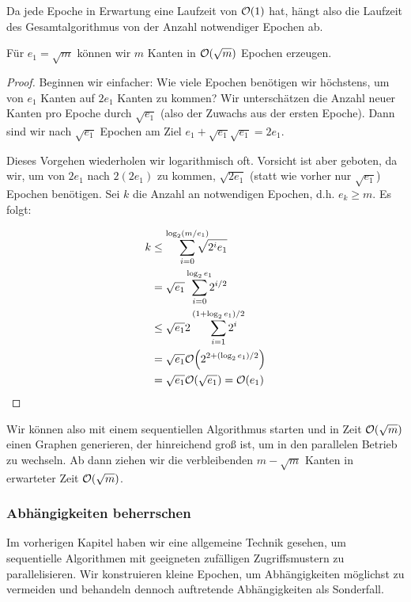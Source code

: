 Da jede Epoche in Erwartung eine Laufzeit von $\mathcal{O}\!\left(1\right)$ hat, hängt also die Laufzeit des Gesamtalgorithmus von der Anzahl notwendiger Epochen ab.

\begin{lemma}
    Für $e_1 = \sqrt{m}$ können wir $m$ Kanten in $\mathcal{O}\!\left(\sqrt{m}\right)$ Epochen erzeugen.
\end{lemma}

\begin{proof}
    Beginnen wir einfacher: Wie viele Epochen benötigen wir höchstens, um von $e_1$ Kanten auf $2e_1$ Kanten zu kommen?
    Wir unterschätzen die Anzahl neuer Kanten pro Epoche durch $\sqrt{e_1}$ (also der Zuwachs aus der ersten Epoche).
    Dann sind wir nach $\sqrt{e_1}$ Epochen am Ziel $e_1 + \sqrt{e_1} \sqrt{e_1} = 2 e_1$.

    Dieses Vorgehen wiederholen wir logarithmisch oft.
    Vorsicht ist aber geboten, da wir, um von $2e_1$ nach $2(2e_1)$ zu kommen, $\sqrt{2 e_1}$ (statt wie vorher nur $\sqrt{e_1}$) Epochen benötigen.
    Sei $k$ die Anzahl an notwendigen Epochen, d.h. $e_k \ge m$.
    Es folgt:

    \begin{align}
        k & \le \smashoperator[r]{\sum_{i=0}^{\ld(m/e_1)}} \sqrt{2^i e_1}      \\
          & = \sqrt{e_1} \smashoperator[r]{\sum_{i=0}^{\ld e_1}} 2^{i/2}       \\
          & \le \sqrt{e_1} 2 \smashoperator[r]{\sum_{i=1}^{(1+\ld e_1)/2}} 2^i \\
          & = \sqrt{e_1} \Oh{2^{2 + (\ld e_1) / 2}}         \\
          & = \sqrt{e_1} \Oh{\sqrt{e_1}} = \Oh{e_1}
    \end{align}
\end{proof}

Wir können also mit einem sequentiellen Algorithmus starten und in Zeit $\mathcal{O}\!\left(\sqrt m\right)$ einen Graphen generieren, der hinreichend groß ist, um in den parallelen Betrieb zu wechseln.
Ab dann ziehen wir die verbleibenden $m - \sqrt{m}$ Kanten in erwarteter Zeit $\mathcal{O}\!\left(\sqrt m\right)$.

\subsubsection{Abhängigkeiten beherrschen}\label{subsec:ba_sanders}
Im vorherigen Kapitel haben wir eine allgemeine Technik gesehen, um sequentielle Algorithmen mit geeigneten zufälligen Zugriffsmustern zu parallelisieren.
Wir konstruieren kleine Epochen, um Abhängigkeiten möglichst zu vermeiden und behandeln dennoch auftretende Abhängigkeiten als Sonderfall.

